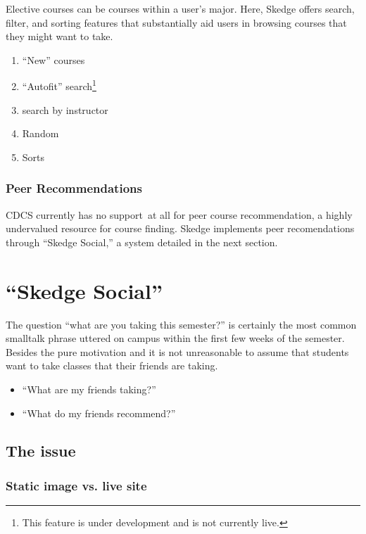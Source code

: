   Elective courses can be courses within a user's major. Here, Skedge offers search, filter, and sorting features that substantially aid users in browsing courses that they might want to take.

  \begin{enumerate}

    \item ``New'' courses
    \item ``Autofit'' search\footnote{This feature is under development and is not currently live.}
    \item search by instructor
    \item Random
    \item Sorts

  \end{enumerate}

  \subsubsection{Peer Recommendations}

  CDCS currently has no support at all for peer course recommendation, a highly undervalued resource for course finding. Skedge implements peer recomendations through ``Skedge Social,'' a system detailed in the next section.


\section{``Skedge Social''}

The question ``what are you taking this semester?'' is certainly the most common smalltalk phrase uttered on campus within the first few weeks of the semester. Besides the pure motivation  and it is not unreasonable to assume that students want to take classes that their friends are taking.

\begin{itemize}
  \item ``What are my friends taking?''
  \item ``What do my friends recommend?''
\end{itemize}

\subsection{The issue}

  \subsubsection{Static image vs. live site}

